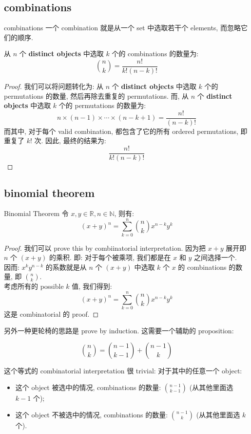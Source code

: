 \subsection{combinations}
\begin{definition}{combinations}
一个 combination 就是从一个 set 中选取若干个 elements, 而忽略它们的顺序.
\end{definition}
\begin{proposition}
    从 $n$ 个 \textbf{distinct objects} 中选取 $k$ 个的 combinations 的数量为: \[
\binom{n}{k} = \frac{n!}{k!(n-k)!}
\]
\end{proposition}
\begin{proof}
    我们可以将问题转化为: 从 $n$ 个 \textbf{distinct objects} 中选取 $k$ 个的 permutations 的数量, 然后再除去重复的 permutations.
    而, 从 $n$ 个 \textbf{distinct objects} 中选取 $k$ 个的 permutations 的数量为: \[
    n \times (n-1) \times \cdots \times (n-k+1) = \frac{n!}{(n-k)!}
    \]
    而其中, 对于每个 valid combination, 都包含了它的所有 ordered permutations, 即重复了 $k!$ 次.
    因此, 最终的结果为: \[
    \frac{n!}{k!(n-k)!}
    \]
\end{proof}


\subsection{binomial theorem}

\begin{theorem}{Binomial Theorem}
令 $x,y\in \mathbb{R}, n \in \mathbb{N}$, 则有: \[
(x+y)^n = \sum_{k=0}^n \binom{n}{k} x^{n-k} y^k
\]
\end{theorem}
\begin{proof}
    我们可以 prove this by combiinatorial interpretation. 因为把 $x+y$ 展开即 $n$ 个 $(x+y)$ 的乘积. 即:
    对于每个被乘项, 我们都是在 $x$ 和 $y$ 之间选择一个.\\
    因而: $x^k y^{n-k}$ 的系数就是从 $n$ 个 $(x+y)$ 中选取 $k$ 个 $x$ 的 combinations 的数量, 即 $\binom{n}{k}$.\\
    考虑所有的 possible $k$ 值, 我们得到: \[
    (x+y)^n = \sum_{k=0}^n \binom{n}{k} x^{n-k} y^k
    \]
    这是 combinatorial 的 proof.
\end{proof}
另外一种更轮椅的思路是 prove by induction. 这需要一个辅助的 proposition:
\begin{proposition}
    \[
    \binom{n}{k} = \binom{n-1}{k-1} + \binom{n-1}{k}
    \]
\end{proposition}
这个等式的 combinatorial interpretation 很 trivial: 对于其中的任意一个 object: 
\begin{itemize}
    \item 这个 object 被选中的情况, combinations 的数量: $\binom{n-1}{k-1}$ (从其他里面选 $k-1$ 个);
    \item 这个 object 不被选中的情况, combinations 的数量: $\binom{n-1}{k}$ (从其他里面选 $k$ 个).
\end{itemize}


